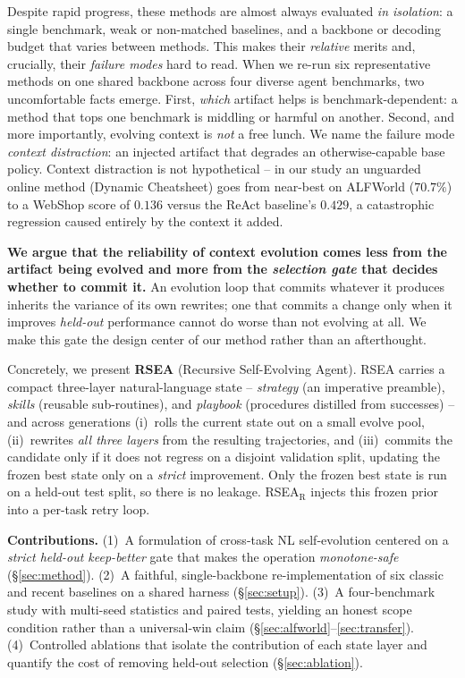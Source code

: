 \documentclass{article}
\begin{document}
Despite rapid progress, these methods are almost always evaluated \emph{in
isolation}: a single benchmark, weak or non-matched baselines, and a backbone or
decoding budget that varies between methods. This makes their \emph{relative} merits
and, crucially, their \emph{failure modes} hard to read. When we re-run six
representative methods on one shared backbone across four diverse agent benchmarks,
two uncomfortable facts emerge. First, \emph{which} artifact helps is
benchmark-dependent: a method that tops one benchmark is middling or harmful on
another. Second, and more importantly, evolving context is \emph{not} a free lunch.
We name the failure mode \emph{context distraction}: an injected artifact that
degrades an otherwise-capable base policy. Context distraction is not hypothetical
-- in our study an unguarded online method (Dynamic Cheatsheet) goes from
near-best on ALFWorld ($70.7\%$) to a WebShop score of $0.136$ versus the ReAct
baseline's $0.429$, a catastrophic regression caused entirely by the context it
added.

\textbf{We argue that the reliability of context evolution comes less from the
artifact being evolved and more from the \emph{selection gate} that decides whether
to commit it.} An evolution loop that commits whatever it produces inherits the
variance of its own rewrites; one that commits a change only when it improves
\emph{held-out} performance cannot do worse than not evolving at all. We make this
gate the design center of our method rather than an afterthought.

Concretely, we present \textbf{RSEA} (Recursive Self-Evolving Agent). RSEA carries a
compact three-layer natural-language state -- \emph{strategy} (an imperative
preamble), \emph{skills} (reusable sub-routines), and \emph{playbook} (procedures
distilled from successes) -- and across generations (i)~rolls the current state out
on a small evolve pool, (ii)~rewrites \emph{all three layers} from the resulting
trajectories, and (iii)~commits the candidate only if it does not regress on a
disjoint validation split, updating the frozen best state only on a \emph{strict}
improvement. Only the frozen best state is run on a held-out test split, so there is
no leakage. RSEA$_\text{R}$ injects this frozen prior into a per-task retry loop.

\textbf{Contributions.} (1)~A formulation of cross-task NL self-evolution centered on
a \emph{strict held-out keep-better} gate that makes the operation
\emph{monotone-safe} (\S\ref{sec:method}). (2)~A faithful, single-backbone
re-implementation of six classic and recent baselines on a shared harness
(\S\ref{sec:setup}). (3)~A four-benchmark study with multi-seed statistics and paired
tests, yielding an honest scope condition rather than a universal-win claim
(\S\ref{sec:alfworld}--\ref{sec:transfer}). (4)~Controlled ablations that isolate the
contribution of each state layer and quantify the cost of removing held-out
selection (\S\ref{sec:ablation}).
\end{document}
